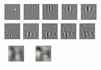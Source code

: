 \documentclass[paperwidth=38in,paperheight=28in,landscape,fontscale=0.4]{baposter}
\begin{document}
\begin{poster}
{
\begin{center}
\includegraphics[scale=1]{1.png} 
\includegraphics[scale=1]{2.png}
\includegraphics[scale=1]{3.png}
\includegraphics[scale=1]{4.png}
\includegraphics[scale=1]{5.png}\\
\includegraphics[scale=1.02]{horse/1.png} 
\includegraphics[scale=1.02]{horse/2.png}
\includegraphics[scale=1.02]{horse/3.png}
\includegraphics[scale=1.02]{horse/4.png}
\includegraphics[scale=1.02]{horse/5.png}\\
\includegraphics[scale=2]{horse0.png}
\includegraphics[scale=2]{horse1.png} 
\end{center}

}
\end{poster}
\end{document}
